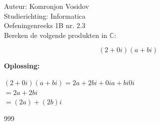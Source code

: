 \documentclass[a4paper]{article}
\begin{document}
	
	\noindent \large Auteur: Komronjon Vosidov \\
	\noindent \large Studierichting: Informatica\\
	\noindent \large Oefeningenreeks 1B nr. 2.3\\
	
	
	
	\normalsize
	Bereken de volgende produkten in $\mathbb{C}$:
	
	\begin{equation*}
		(2+0i) (a+bi)
	\end{equation*}
	
	
	\noindent \textbf{Oplossing:}
	
	$(2+0i) (a+bi) = 2a + 2bi + 0ia + bi0i $ \\	
	
	$= 2a+2bi $ \\
	
	$= (2a)+(2b)i$ \\

	
\begin{thebibliography}{999}
	
\end{thebibliography}
	
\end{document}
